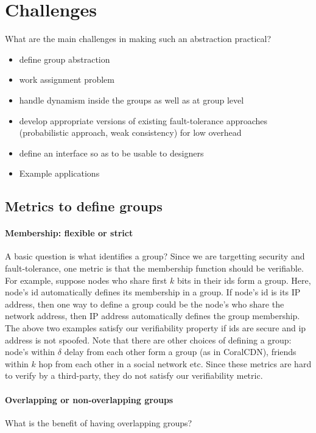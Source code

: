 \section{Challenges}
What are the main challenges in making such an abstraction practical?

\begin{itemize}
\item{} define group abstraction
\item{} work assignment problem
\item{} handle dynamism inside the groups as well as at group level
\item{} develop appropriate versions of existing fault-tolerance approaches (probabilistic approach, weak consistency) for low overhead 
\item{} define an interface so as to be usable to designers 
\item{} Example applications
\end{itemize}

\subsection{Metrics to define groups}
\paragraph{Membership: flexible or strict}
A basic question is what identifies a group? Since we are targetting security and fault-tolerance, one metric is that the membership function should be verifiable. For example, suppose nodes who share first $k$ bits in their ids form a group. Here, node's id automatically defines its membership in a group. If node's id is its IP address, then one way to define a group could be the node's who share the network address, then IP address automatically defines the group membership. The above two examples satisfy our verifiability property if ids are secure and ip address is not spoofed.
Note that there are other choices of defining a group: node's within $\delta$ delay from each other form a group (as in CoralCDN), friends within $k$ hop from each other in a social network etc. Since these metrics are hard to verify by a third-party, they do not satisfy our verifiability metric.

\paragraph{Overlapping or non-overlapping groups}
What is the benefit of having overlapping groups?



